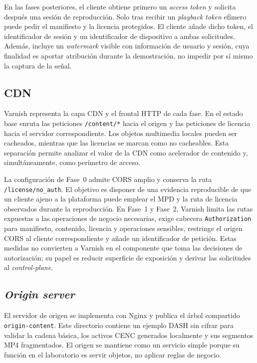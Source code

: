 En las fases posteriores, el cliente obtiene primero un \textit{access token} y solicita después una sesión de reproducción. Solo tras recibir un \textit{playback token} efímero puede pedir el manifiesto y la licencia protegidos. El cliente añade dicho token, el identificador de sesión y un identificador de dispositivo a ambas solicitudes. Además, incluye un \textit{watermark} visible con información de usuario y sesión, cuya finalidad es aportar atribución durante la demostración, no impedir por sí mismo la captura de la señal.

\subsection{CDN}

Varnish representa la capa CDN y el frontal HTTP de cada fase. En el estado base enruta las peticiones \nolinkurl{/content/*} hacia el origen y las peticiones de licencia hacia el servidor correspondiente. Los objetos multimedia locales pueden ser cacheados, mientras que las licencias se marcan como no cacheables. Esta separación permite analizar el valor de la CDN como acelerador de contenido y, simultáneamente, como perímetro de acceso.

La configuración de Fase~0 admite CORS amplio y conserva la ruta \nolinkurl{/license/no_auth}. El objetivo es disponer de una evidencia reproducible de que un cliente ajeno a la plataforma puede emplear el MPD y la ruta de licencia observados durante la reproducción. En Fase~1 y Fase~2, Varnish limita las rutas expuestas a las operaciones de negocio necesarias, exige cabecera \nolinkurl{Authorization} para manifiesto, contenido, licencia y operaciones sensibles, restringe el origen CORS al cliente correspondiente y añade un identificador de petición. Estas medidas no convierten a Varnish en el componente que toma las decisiones de autorización; su papel es reducir superficie de exposición y derivar las solicitudes al \textit{control-plane}.

\subsection{\textit{Origin server}}

El servidor de origen se implementa con Nginx y publica el árbol compartido \nolinkurl{origin-content}. Este directorio contiene un ejemplo DASH sin cifrar para validar la cadena básica, los activos CENC generados localmente y sus segmentos MP4 fragmentados. El origen se mantiene como un servicio simple porque su función en el laboratorio es servir objetos, no aplicar reglas de negocio.

